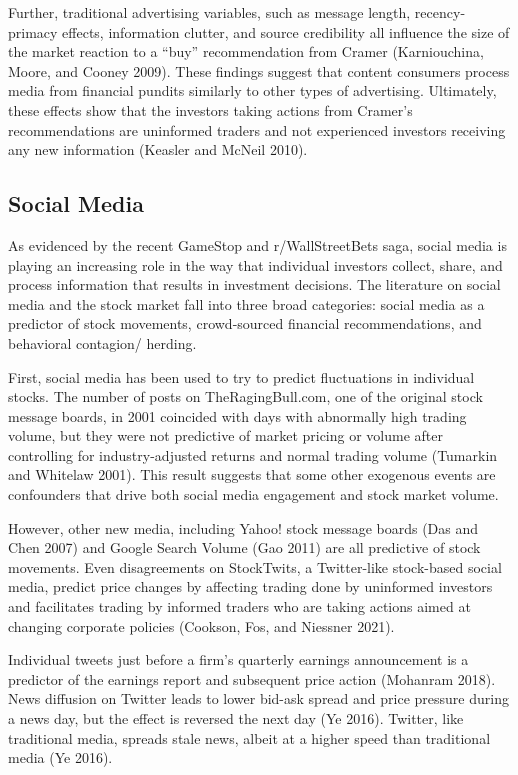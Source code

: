 \documentclass[12pt,]{article}
\begin{document}
Further, traditional advertising variables, such as message length,
recency-primacy effects, information clutter, and source credibility all
influence the size of the market reaction to a ``buy'' recommendation
from Cramer (Karniouchina, Moore, and Cooney 2009). These findings
suggest that content consumers process media from financial pundits
similarly to other types of advertising. Ultimately, these effects show
that the investors taking actions from Cramer's recommendations are
uninformed traders and not experienced investors receiving any new
information (Keasler and McNeil 2010).

\hypertarget{social-media}{%
\subsection{Social Media}\label{social-media}}

As evidenced by the recent GameStop and r/WallStreetBets saga, social
media is playing an increasing role in the way that individual investors
collect, share, and process information that results in investment
decisions. The literature on social media and the stock market fall into
three broad categories: social media as a predictor of stock movements,
crowd-sourced financial recommendations, and behavioral contagion/
herding.

First, social media has been used to try to predict fluctuations in
individual stocks. The number of posts on TheRagingBull.com, one of the
original stock message boards, in 2001 coincided with days with
abnormally high trading volume, but they were not predictive of market
pricing or volume after controlling for industry-adjusted returns and
normal trading volume (Tumarkin and Whitelaw 2001). This result suggests
that some other exogenous events are confounders that drive both social
media engagement and stock market volume.

However, other new media, including Yahoo! stock message boards (Das and
Chen 2007) and Google Search Volume (Gao 2011) are all predictive of
stock movements. Even disagreements on StockTwits, a Twitter-like
stock-based social media, predict price changes by affecting trading
done by uninformed investors and facilitates trading by informed traders
who are taking actions aimed at changing corporate policies (Cookson,
Fos, and Niessner 2021).

Individual tweets just before a firm's quarterly earnings announcement
is a predictor of the earnings report and subsequent price action
(Mohanram 2018). News diffusion on Twitter leads to lower bid-ask spread
and price pressure during a news day, but the effect is reversed the
next day (Ye 2016). Twitter, like traditional media, spreads stale news,
albeit at a higher speed than traditional media (Ye 2016).
\end{document}
